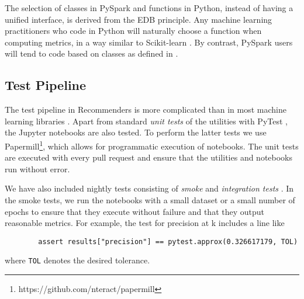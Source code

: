 The selection of classes in PySpark and functions in Python, instead of having a unified
interface, is derived from the EDB principle. Any machine learning practitioners
who code in Python will naturally choose a function when computing metrics, 
in a way similar to Scikit-learn \cite{pedregosa2011scikit}. By contrast, PySpark users 
will tend to code based on classes as defined in \cite{meng2016mllib}. 

\subsection{Test Pipeline}

The test pipeline in Recommenders is more complicated than in most machine learning
libraries \cite{abadi2016tensorflow,paszke2017automatic,pedregosa2011scikit,ke2017lightgbm}.
Apart from standard {\em unit tests} of the utilities with PyTest \cite{krekel2004pytest}, 
the Jupyter notebooks are also tested. To perform the latter tests we use Papermill\footnote{https://github.com/nteract/papermill}, 
which allows for programmatic execution of notebooks. The
unit tests are executed with every pull request and ensure that the utilities and 
notebooks run without error.

We have also included nightly tests consisting of {\em smoke} and {\em integration tests}
\cite{gonzalez-fierro2018beginners}. In the smoke tests, we run the notebooks with a 
small dataset or a small number of epochs to ensure that they execute without failure and that they 
output reasonable metrics. 
For example, the test for precision at k includes a line like
\begin{verbatim}
        assert results["precision"] == pytest.approx(0.326617179, TOL)
\end{verbatim}
where \verb!TOL! denotes the desired tolerance.
%

